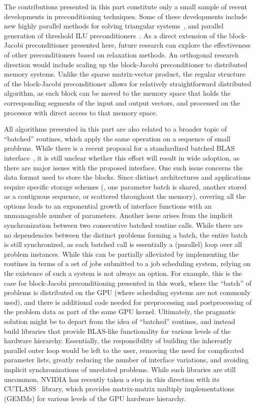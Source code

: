 The contributions presented in this part constitute only a small sample of
recent developments in preconditioning techniques. Some of these developments
include new highly parallel methods for solving triangular
systems~\cite{triangular-solve, isai, triangular-iterative}, and parallel
generation of threshold ILU preconditioners~\cite{ilut, ilut-gpu}. As a direct
extension of the block-Jacobi preconditioner presented here, future research can
explore the effectiveness of other preconditioners based on relaxation methods.
An orthogonal research direction would include scaling up the block-Jacobi
preconditioner to distributed memory systems. Unlike the sparse matrix-vector
product, the regular structure of the block-Jacobi preconditioner allows for
relatively straightforward distributed algorithm, as each block can be moved to
the memory space that holds the corresponding segments of the input and output
vectors, and processed on the processor with direct access to that memory space.

All algorithms presented in this part are also related to a broader topic of
``batched'' routines, which apply the same operation on a sequence of small
problems. While there is a recent proposal for a standardized batched BLAS
interface~\cite{batched-blas}, it is still unclear whether this effort will result in
wide adoption, as there are major issues with the proposed interface.
One such issue concerns the data format used to store the blocks. Since distinct
architectures and applications require specific storage schemes (\eg, one
parameter batch is shared, another stored as a contiguous sequence, or scattered
throughout the memory), covering all the options leads to an exponential
growth of interface functions with an unmanageable number of parameters.
Another issue arises from the implicit synchronization between two consecutive
batched routine calls. While there are no dependencies between the distinct
problems forming a batch, the entire batch is still synchronized, as each
batched call is essentially a (parallel) loop over all problem instances. While
this can be partially alleviated by implementing the routines in terms of a set
of jobs submitted to a job scheduling system, relying on the existence of such a
system is not always an option. For example, this is the case for block-Jacobi
preconditioning presented in this work, where the ``batch'' of problems is
distributed on the GPU (where scheduling systems are not commonly used), and
there is additional code needed for preprocessing and postprocessing of the
problem data as part of the same GPU kernel. Ultimately, the pragmatic solution
might be to depart from the idea of ``batched'' routines, and instead build
libraries that provide BLAS-like functionality for various levels of the
hardware hierarchy.  Essentially, the responsibility of building the inherently
parallel outer loop would be left to the user, removing the need for complicated
parameter lists, greatly reducing the number of interface variations, and
avoiding implicit synchronizations of unrelated problems. While such libraries
are still uncommon, NVIDIA has recently taken a step in this direction with its
CUTLASS~\cite{cutlass} library, which provides matrix-matrix multiply
implementations (GEMMs) for various levels of the GPU hardware hierarchy.

